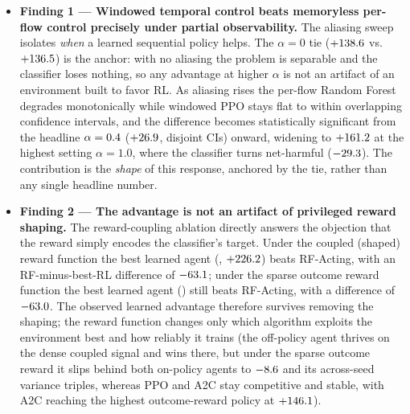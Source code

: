 \begin{itemize}
    \item \textbf{Finding 1 --- Windowed temporal control beats memoryless per-flow control precisely under partial observability.} The aliasing sweep isolates \emph{when} a learned sequential policy helps. The $\alpha=0$ tie ($+138.6$ vs.\ $+136.5$) is the anchor: with no aliasing the problem is separable and the classifier loses nothing, so any advantage at higher $\alpha$ is not an artifact of an environment built to favor RL. As aliasing rises the per-flow Random Forest degrades monotonically while windowed PPO stays flat to within overlapping confidence intervals, and the difference becomes statistically significant from the headline $\alpha=0.4$ ($+26.9$, disjoint CIs) onward, widening to $+161.2$ at the highest setting $\alpha=1.0$, where the classifier turns net-harmful ($-29.3$). The contribution is the \emph{shape} of this response, anchored by the tie, rather than any single headline number.

    \item \textbf{Finding 2 --- The advantage is not an artifact of privileged reward shaping.} The reward-coupling ablation directly answers the objection that the reward simply encodes the classifier's target. Under the coupled (shaped) reward function the best learned agent (\CouplingBestCoupled, $+226.2$) beats RF-Acting, with an RF-minus-best-RL difference of $-63.1$; under the sparse outcome reward function the best learned agent (\CouplingBestOutcome) still beats RF-Acting, with a difference of $-63.0$. The observed learned advantage therefore survives removing the shaping; the reward function changes only which algorithm exploits the environment best and how reliably it trains (the off-policy agent thrives on the dense coupled signal and wins there, but under the sparse outcome reward it slips behind both on-policy agents to $-8.6$ and its across-seed variance triples, whereas PPO and A2C stay competitive and stable, with A2C reaching the highest outcome-reward policy at $+146.1$).


\end{itemize}
